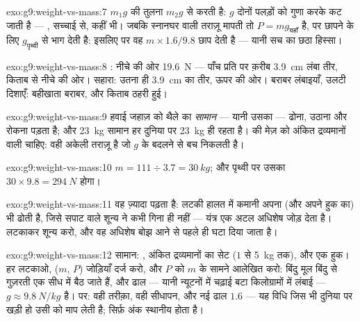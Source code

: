 \begin{solution}{exo:g9:weight-vs-mass:7}
 $m_1 g$ की तुलना $m_2 g$ से करती है: $g$ दोनों पलड़ों को गुणा
करके कट जाती है --- , सच्चाई से, कहीं भी। जबकि स्नानघर
वाली तराज़ू मापती तो $P = m g_{\text{यहाँ}}$ है, पर  छापने के
लिए $g_{\text{पृथ्वी}}$ से भाग देती है: इसलिए  पर वह
$m \times 1.6/9.8$ छाप देती है --- यानी सच का छठा हिस्सा।
\end{solution}

\begin{solution}{exo:g9:weight-vs-mass:8}
: नीचे की ओर \qty{19.6}{N} --- पाँच  प्रति  पर
क़रीब \qty{3.9}{cm} लंबा तीर, किताब से नीचे की ओर। सहारा: उतना ही
\qty{3.9}{cm} का तीर, ऊपर की ओर। बराबर लंबाइयाँ, उलटी दिशाएँ:
बहीखाता बराबर, और किताब ठहरी हुई।
\end{solution}

\begin{solution}{exo:g9:weight-vs-mass:9}
हवाई जहाज़ को थैले का \emph{सामान} --- यानी उसका  --- ढोना,
उठाना और रोकना पड़ता है; और \qty{23}{kg} सामान हर दुनिया पर
\qty{23}{kg} ही रहता है।  की मेज़ को अंकित द्रव्यमानों वाली 
चाहिए: वही अकेली तराज़ू है जो $g$ के बदलने से बच निकलती है।
\end{solution}

\begin{solution}{exo:g9:weight-vs-mass:10}
$m = 111 \div 3.7 = \qty{30}{kg}$; और पृथ्वी पर उसका 
$30 \times 9.8 = \qty{294}{N}$ होगा।
\end{solution}

\begin{solution}{exo:g9:weight-vs-mass:11}
वह ज़्यादा पढ़ता है: लटकी हालत में कमानी अपना (और अपने हुक का)  भी
ढोती है, जिसे सपाट वाले शून्य ने कभी गिना ही नहीं --- यंत्र एक
अटल अधिशेष जोड़ देता है। लटकाकर शून्य करो, और वह अधिशेष बोझ आने से
पहले ही घटा दिया जाता है।
\end{solution}

\begin{solution}{exo:g9:weight-vs-mass:12}
सामान: , अंकित द्रव्यमानों का सेट ($1$ से \qty{5}{kg} तक), और
एक हुक। हर  लटकाओ, ($m$, $P$) जोड़ियाँ दर्ज करो, और $P$ को
$m$ के सामने आलेखित करो: बिंदु मूल बिंदु से गुज़रती एक सीध में बैठ जाते
हैं, और ढाल --- यानी न्यूटनों में चढ़ाई बटा किलोग्रामों में लंबाई ---
$g \approx \qty{9.8}{N/kg}$ है।  पर: वही तरीक़ा, वही सीधापन, और
नई ढाल $1.6$ --- यह विधि जिस भी दुनिया पर खड़ी हो उसी को माप लेती है;
सिर्फ़ अंक स्थानीय होता है।
\end{solution}

